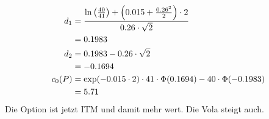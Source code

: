 \documentclass{article}
\begin{document}
\begin{enumerate}[label=(\alph*)]
		\begin{align}
			d_1 &= \frac{\ln\left(\frac{40}{41}\right) + \left(0.015+\frac{0.26^2}{2}\right)\cdot 2}{0.26\cdot\sqrt{2}} \notag \\
			&= 0.1983 \notag \\
			d_2 &= 0.1983 - 0.26\cdot\sqrt{2} \notag \\
			&= -0.1694 \notag \\
			c_0(P) &= \exp(-0.015\cdot 2)\cdot 41\cdot\Phi(0.1694) - 40\cdot\Phi(-0.1983) \notag \\
			&= 5.71 \notag
		\end{align}
		Die Option ist jetzt ITM und damit mehr wert. Die Vola steigt auch.
	\end{enumerate}
	
\end{document}
